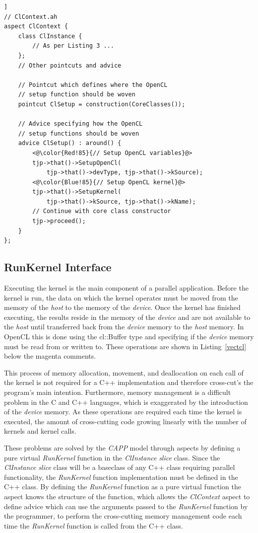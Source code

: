 \documentclass{sig-alternate-05-2015}
\begin{document}
\begin{lstlisting}[caption=Abstract aspect with the pointcut and advice for
OpenCL setup,label=clsetup,float=[!t]]
// ClContext.ah
aspect ClContext {
	class ClInstance {
		// As per Listing 3 ...
	};
	// Other pointcuts and advice

	// Pointcut which defines where the OpenCL
	// setup function should be woven
	pointcut ClSetup = construction(CoreClasses());
  
	// Advice specifying how the OpenCL
	// setup functions should be woven
	advice ClSetup() : around() {
		<@\color{Red!85}{// Setup OpenCL variables}@>
		tjp->that()->SetupOpenCl(
			tjp->that()->devType, tjp->that()->kSource);
		<@\color{Blue!85}{// Setup OpenCL kernel}@>
		tjp->that()->SetupKernel(
			tjp->that()->kSource, tjp->that()->kName); 
		// Continue with core class constructor
		tjp->proceed();
	}
};
\end{lstlisting}

\subsection{RunKernel Interface}

Executing the kernel is the main component of a parallel application. Before the
kernel is run, the data on which the kernel operates must be moved from the
memory of the \textit{host} to the memory of the \textit{device}. Once the
kernel has finished executing, the results reside in the memory of the
\textit{device} and are not available to the \textit{host} until transferred
back from the \textit{device} memory to the \textit{host} memory. In OpenCL this
is done using the cl::Buffer type and specifying if the \textit{device} memory
must be read from or written to. These operations are shown in Listing~\ref{vectcl} 
below the magenta comments. 

This process of memory allocation, movement, and
deallocation on each call of the kernel is not required for a C++ implementation
and therefore cross-cut's the program's main intention. Furthermore, memory management 
is a difficult problem in the C and C++ languages, which is exaggerated by the 
introduction of the \textit{device} memory. As these operations are required each 
time the kernel is executed, the amount of cross-cutting code growing linearly 
with the number of kernels and kernel calls. 

These problems are solved by the \textit{CAPP} model through aspects by defining
a pure virtual \textit{RunKernel} function in the \textit{ClInstance} \textit{slice} class. 
Since the \textit{ClInstance} 
\textit{slice} class will be a  baseclass of any C++ class requiring parallel 
functionality, the \textit{RunKernel} function implementation must be defined in the 
C++ class. By defining the \textit{RunKernel} function as a pure virtual
function the aspect knows the structure of the function, which allows the 
\textit{ClContext} aspect to define advice which can use the arguments passed to
the \textit{RunKernel} function by the programmer, to perform the cross-cutting 
memory management code each time the \textit{RunKernel} function is called from
the C++ class.
\end{document}
